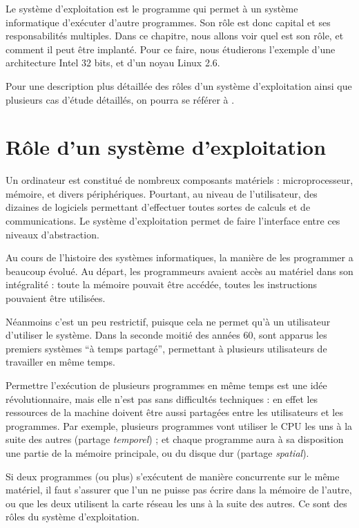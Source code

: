 Le système d'exploitation est le programme qui permet à un système informatique
d'exécuter d'autre programmes. Son rôle est donc capital et ses responsabilités
multiples. Dans ce chapitre, nous allons voir quel est son rôle, et comment il
peut être implanté. Pour ce faire, nous étudierons l'exemple d'une architecture
Intel 32 bits, et d'un noyau Linux 2.6.

Pour une description plus détaillée des rôles d'un système d'exploitation ainsi
que plusieurs cas d'étude détaillés, on pourra se référer à \cite{tanenbaum}.

\section{Rôle d'un système d'exploitation}

Un ordinateur est constitué de nombreux composants matériels : microprocesseur,
mémoire, et divers périphériques. Pourtant, au niveau de l'utilisateur, des
dizaines de logiciels permettant d'effectuer toutes sortes de calculs et de
communications. Le système d'exploitation permet de faire l'interface entre ces
niveaux d'abstraction.

Au cours de l'histoire des systèmes informatiques, la manière de les programmer
a beaucoup évolué. Au départ, les programmeurs avaient accès au matériel dans
son intégralité : toute la mémoire pouvait être accédée, toutes les instructions
pouvaient être utilisées.

Néanmoins c'est un peu restrictif, puisque cela ne permet qu'à un utilisateur
d'utiliser le système. Dans la seconde moitié des années 60, sont apparus les
premiers systèmes ``à temps partagé'', permettant à plusieurs utilisateurs de
travailler en même temps.

Permettre l'exécution de plusieurs programmes en même temps est une idée
révolutionnaire, mais elle n'est pas sans difficultés techniques : en effet les
ressources de la machine doivent être aussi partagées entre les utilisateurs et
les programmes. Par exemple, plusieurs programmes vont utiliser le CPU les uns à
la suite des autres (partage \emph{temporel}) ; et chaque programme aura à sa
disposition une partie de la mémoire principale, ou du disque dur (partage
\emph{spatial}).

Si deux programmes (ou plus) s'exécutent de manière concurrente sur le même
matériel, il faut s'assurer que l'un ne puisse pas écrire dans la mémoire de
l'autre, ou que les deux utilisent la carte réseau les uns à la suite des
autres. Ce sont des rôles du système d'exploitation.

